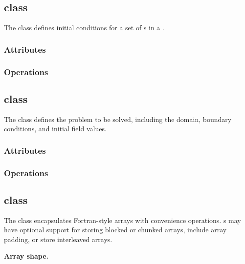 \documentclass{article}
\begin{document}
\subsection{ class}

The  class defines initial conditions for a set of
s in a .


\subsubsection{Attributes}

\subsubsection{Operations}

\subsection{ class}

The  class defines the problem to be solved, including
the domain, boundary conditions, and initial field values.


\subsubsection{Attributes}

\subsubsection{Operations}

\subsection{ class}

The  class encapsulates Fortran-style arrays with
convenience operations.  s may have optional support for
storing blocked or chunked arrays, include array padding, or store
interleaved arrays.

\textbf{Array shape.}
\end{document}

